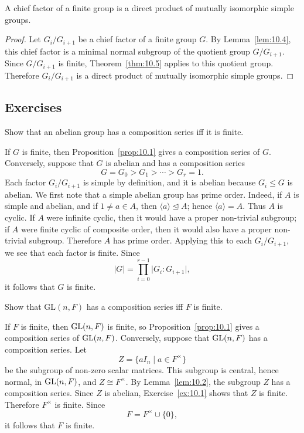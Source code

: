 \documentclass[../Odyssey_Project.tex]{subfiles}
\begin{document}
\begin{corollary}
\label{cor:10.6}
A chief factor of a finite group is a direct product of mutually isomorphic simple groups.
\end{corollary}
\begin{proof}
Let $G_i/G_{i+1}$ be a chief factor of a finite group $G$. By Lemma~\ref{lem:10.4}, this chief factor is a minimal normal subgroup of the quotient group $G/G_{i+1}$. Since $G/G_{i+1}$ is finite, Theorem~\ref{thm:10.5} applies to this quotient group. Therefore $G_i/G_{i+1}$ is a direct product of mutually isomorphic simple groups.
\end{proof}

\subsection*{Exercises}

\begin{exercise}
\label{ex:10.1}
Show that an abelian group has a composition series iff it is finite.
\end{exercise}
\begin{solution}
If $G$ is finite, then Proposition~\ref{prop:10.1} gives a composition series of $G$. Conversely, suppose that $G$ is abelian and has a composition series
\[
  G=G_0>G_1>\cdots>G_r=1.
\]
Each factor $G_i/G_{i+1}$ is simple by definition, and it is abelian because $G_i\leq G$ is abelian. We first note that a simple abelian group has prime order. Indeed, if $A$ is simple and abelian, and if $1\neq a\in A$, then $\langle a\rangle\trianglelefteq A$; hence $\langle a\rangle=A$. Thus $A$ is cyclic. If $A$ were infinite cyclic, then it would have a proper non-trivial subgroup; if $A$ were finite cyclic of composite order, then it would also have a proper non-trivial subgroup. Therefore $A$ has prime order. Applying this to each $G_i/G_{i+1}$, we see that each factor is finite. Since
\[
  \lvert G\rvert
  =
  \prod_{i=0}^{r-1}\lvert G_i:G_{i+1}\rvert,
\]
it follows that $G$ is finite.
\end{solution}

\begin{exercise}
\label{ex:10.2}
Show that $\mathrm{GL}(n, F)$ has a composition series iff $F$ is finite.
\end{exercise}
\begin{solution}
If $F$ is finite, then $\operatorname{GL}(n,F)$ is finite, so Proposition~\ref{prop:10.1} gives a composition series of $\operatorname{GL}(n,F)$. Conversely, suppose that $\operatorname{GL}(n,F)$ has a composition series. Let
\[
  Z=\{aI_n\mid a\in F^\times\}
\]
be the subgroup of non-zero scalar matrices. This subgroup is central, hence normal, in $\operatorname{GL}(n,F)$, and $Z\cong F^\times$. By Lemma~\ref{lem:10.2}, the subgroup $Z$ has a composition series. Since $Z$ is abelian, Exercise~\ref{ex:10.1} shows that $Z$ is finite. Therefore $F^\times$ is finite. Since
\[
  F=F^\times\cup\{0\},
\]
it follows that $F$ is finite.
\end{solution}
\end{document}
